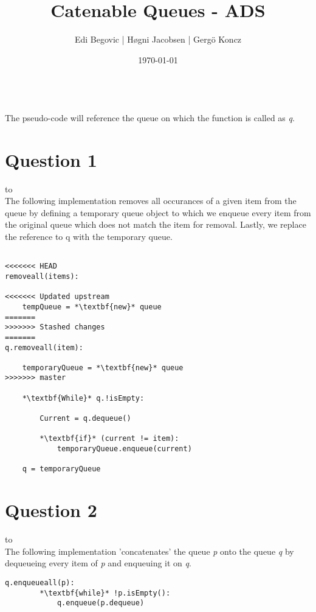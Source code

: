 \documentclass[a4paper]{article}
\title{Catenable Queues - ADS}
\author{Edi Begovic | Høgni Jacobsen | Gergö Koncz}
\date{\today}
\def\headline#1{\hbox to \hsize{\hrulefill\quad\lower.3em\hbox{#1}\quad\hrulefill}}
\begin{document}
 
\maketitle

\ \\
\noindent
The pseudo-code will reference the queue on which the function is called as \textit{q}.
\ \\
\section*{Question 1}
\headline{-} \ \\

\noindent
The following implementation removes all occurances of a given item from the queue by defining a temporary queue
object to which we enqueue every item from the original queue which does not match the item for removal. 
Lastly, we replace the reference to q with the temporary queue.

\noindent
\begin{lstlisting}[escapeinside={{*}{*}}]

<<<<<<< HEAD
removeall(items):

<<<<<<< Updated upstream
    tempQueue = *\textbf{new}* queue
=======
>>>>>>> Stashed changes
=======
q.removeall(item):

    temporaryQueue = *\textbf{new}* queue
>>>>>>> master

    *\textbf{While}* q.!isEmpty:

        Current = q.dequeue()
        
        *\textbf{if}* (current != item):
            temporaryQueue.enqueue(current)
    
    q = temporaryQueue

\end{lstlisting}

\newpage
\section*{Question 2}
\headline{-} \ \\
The following implementation 'concatenates' the queue \textit{p} onto the queue \textit{q} by
dequeueing every item of \textit{p} and enqueuing it on \textit{q}.
 \\

\noindent

\begin{lstlisting}[escapeinside={{*}{*}}]
    q.enqueueall(p):
        *\textbf{while}* !p.isEmpty():
            q.enqueue(p.dequeue)
\end{lstlisting}
\end{document}

